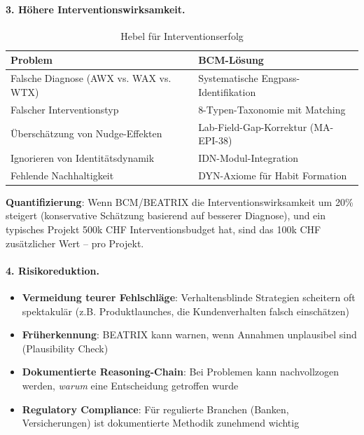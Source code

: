 \paragraph{3. Höhere Interventionswirksamkeit.}

\begin{table}[h]
\centering
\caption{Hebel für Interventionserfolg}
\begin{tabular}{@{}ll@{}}
\toprule
\textbf{Problem} & \textbf{BCM-Lösung} \\
\midrule
Falsche Diagnose (AWX vs. WAX vs. WTX) & Systematische Engpass-Identifikation \\
Falscher Interventionstyp & 8-Typen-Taxonomie mit Matching \\
Überschätzung von Nudge-Effekten & Lab-Field-Gap-Korrektur (MA-EPI-38) \\
Ignorieren von Identitätsdynamik & IDN-Modul-Integration \\
Fehlende Nachhaltigkeit & DYN-Axiome für Habit Formation \\
\bottomrule
\end{tabular}
\end{table}

\textbf{Quantifizierung}: Wenn BCM/BEATRIX die Interventionswirksamkeit um 20\% steigert (konservative Schätzung basierend auf besserer Diagnose), und ein typisches Projekt 500k CHF Interventionsbudget hat, sind das 100k CHF zusätzlicher Wert -- pro Projekt.

\paragraph{4. Risikoreduktion.}

\begin{itemize}
    \item \textbf{Vermeidung teurer Fehlschläge}: Verhaltensblinde Strategien scheitern oft spektakulär (z.B. Produktlaunches, die Kundenverhalten falsch einschätzen)
    \item \textbf{Früherkennung}: BEATRIX kann warnen, wenn Annahmen unplausibel sind (Plausibility Check)
    \item \textbf{Dokumentierte Reasoning-Chain}: Bei Problemen kann nachvollzogen werden, \textit{warum} eine Entscheidung getroffen wurde
    \item \textbf{Regulatory Compliance}: Für regulierte Branchen (Banken, Versicherungen) ist dokumentierte Methodik zunehmend wichtig
\end{itemize}


